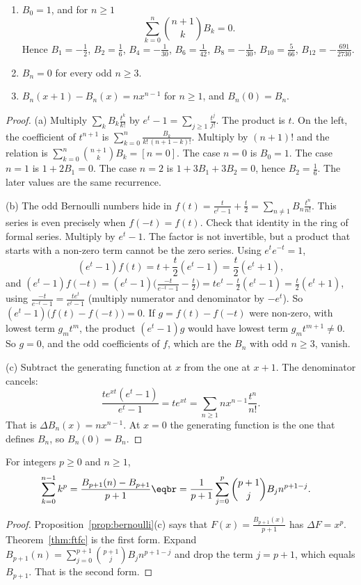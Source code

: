 \begin{proposition}\label{prop:bernoulli}
\begin{enumerate}[label=(\alph*)]
\item $B_0=1$, and for $n\ge1$
\[
\sum_{k=0}^{n}\binom{n+1}kB_k=0.
\]
Hence $B_1=-\frac12$, $B_2=\frac16$, $B_4=-\frac1{30}$,
$B_6=\frac1{42}$, $B_8=-\frac1{30}$, $B_{10}=\frac5{66}$, $B_{12}=-\frac{691}{2730}$.
\item $B_n=0$ for every odd $n\ge3$.
\item $B_n(x+1)-B_n(x)=nx^{n-1}$ for $n\ge1$, and $B_n(0)=B_n$.
\end{enumerate}
\end{proposition}
\begin{proof}
(a) Multiply $\sum_kB_k\frac{t^k}{k!}$ by $e^t-1=\sum_{j\ge1}\frac{t^j}{j!}$. The product is $t$. On the left, the coefficient of $t^{n+1}$ is $\sum_{k=0}^n\frac{B_k}{k!\,(n+1-k)!}$. Multiply by $(n+1)!$ and the relation is $\sum_{k=0}^n\binom{n+1}kB_k=[n=0]$. The case $n=0$ is $B_0=1$. The case $n=1$ is $1+2B_1=0$. The case $n=2$ is $1+3B_1+3B_2=0$, hence $B_2=\frac16$. The later values are the same recurrence.

(b) The odd Bernoulli numbers hide in $f(t)=\frac t{e^t-1}+\frac t2=\sum_{n\ne1}B_n\frac{t^n}{n!}$. This series is even precisely when $f(-t)=f(t)$. Check that identity in the ring of formal series. Multiply by $e^t-1$. The factor is not invertible, but a product that starts with a non-zero term cannot be the zero series. Using $e^te^{-t}=1$,
\[
(e^t-1)f(t)=t+\frac t2(e^t-1)=\frac t2(e^t+1),
\]
and
$(e^t-1)f(-t)=(e^t-1)\bigl(\frac{-t}{e^{-t}-1}-\frac t2\bigr)=te^t-\frac t2(e^t-1)=\frac t2(e^t+1)$, using
$\frac{-t}{e^{-t}-1}=\frac{te^t}{e^t-1}$ (multiply numerator and denominator by $-e^t$). So $(e^t-1)\bigl(f(t)-f(-t)\bigr)=0$.
If $g=f(t)-f(-t)$ were non-zero, with lowest term $g_mt^m$, the product $(e^t-1)g$ would have lowest term $g_mt^{m+1}\ne0$.
So $g=0$, and the odd coefficients of $f$, which are the $B_n$ with odd $n\ge3$, vanish.

(c) Subtract the generating function at $x$ from the one at $x+1$. The denominator cancels:
\[
\frac{te^{xt}(e^t-1)}{e^t-1}=te^{xt}=\sum_{n\ge1}nx^{n-1}\frac{t^n}{n!}.
\]
That is $\Delta B_n(x)=nx^{n-1}$. At $x=0$ the generating function is the one that defines $B_n$, so $B_n(0)=B_n$.
\end{proof}

\begin{theorem}\label{thm:faulhaber}
For integers $p\ge0$ and $n\ge1$,
\[
\begin{aligned}\sum_{k=0}^{n-1}k^p&=\frac{B_{p+1}(n)-B_{p+1}}{p+1}\eqbr=\frac1{p+1}\sum_{j=0}^p\binom{p+1}jB_jn^{p+1-j}.\end{aligned}
\]
\end{theorem}
\begin{proof}
Proposition~\ref{prop:bernoulli}(c) says that $F(x)=\frac{B_{p+1}(x)}{p+1}$ has $\Delta F=x^p$. Theorem~\ref{thm:ftfc} is the first form. Expand $B_{p+1}(n)=\sum_{j=0}^{p+1}\binom{p+1}jB_jn^{p+1-j}$ and drop the term $j=p+1$, which equals $B_{p+1}$. That is the second form.
\end{proof}


